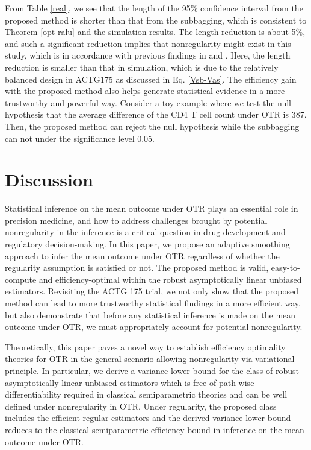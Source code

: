 \documentclass[11pt]{article}
\theoremstyle{referenceplain}
\theoremstyle{referencedefinition}
\theoremstyle{referenceremark}
\begin{document}
From Table \ref{real}, we see that the length of the 95\% confidence interval from the proposed method is shorter than that from the subbagging, which is consistent to Theorem \ref{opt-ralu} and the simulation results. The length reduction is about 5\%, and such a significant reduction implies that nonregularity might exist in this study, which is in accordance with previous findings in \citet{fan2017concordance} and \citet{shi2020breaking}. Here, the length reduction is smaller than that in simulation, which is due to the relatively balanced design in ACTG175 \citep{hammer1996trial} as discussed in Eq. \eqref{Vsb-Vas}. The efficiency gain with the proposed method also helps generate statistical evidence in a more trustworthy and powerful way. Consider a toy example where we test the null hypothesis that the average difference of the CD4 T cell count under OTR is 387. Then, the proposed method can reject the null hypothesis while the subbagging can not under the significance level 0.05. 

\section{Discussion}
Statistical inference on the mean outcome under OTR plays an essential role in precision medicine, and how to address challenges brought by potential nonregularity in the inference is a critical question in drug development and regulatory decision-making. In this paper, we propose an adaptive smoothing approach to infer the mean outcome under OTR regardless of whether the regularity assumption is satisfied or not. The proposed method is valid, easy-to-compute and efficiency-optimal within the robust asymptotically linear unbiased estimators. Revisiting the ACTG 175 trial, we not only show that the proposed method can lead to more trustworthy statistical findings in a more efficient way, but also demonstrate that before any statistical inference is made on the mean outcome under OTR, we must appropriately account for potential nonregularity. 

Theoretically, this paper paves a novel way to establish efficiency optimality theories for OTR in the general scenario allowing nonregularity via variational principle. In particular, we derive a variance lower bound for the class of robust asymptotically linear unbiased estimators which is free of path-wise differentiability required in classical semiparametric theories and can be well defined under nonregularity in OTR. Under regularity, the proposed class includes the efficient regular estimators and the derived variance lower bound reduces to the classical semiparametric efficiency bound in inference on the mean outcome under OTR. 
\end{document}
